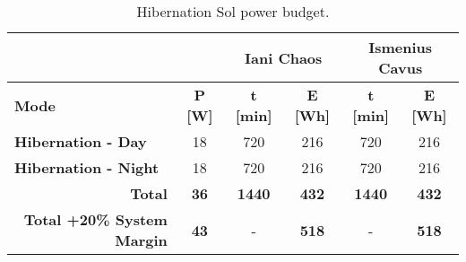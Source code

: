 \begin{table}[h]
\footnotesize
\centering
\caption[Hibernation Sol power budget]
    {Hibernation Sol power budget.}
\label{tab:hibernation-sol-power-budget}
\begin{tabular}{lc|c|c|c|c|}
\cline{3-6}
 & \textbf{} & \multicolumn{2}{c|}{\textbf{Iani Chaos}} & \multicolumn{2}{c|}{\textbf{Ismenius Cavus}} \\ \hline
\multicolumn{1}{|l|}{\textbf{Mode}} & \textbf{P {[}W{]}} & \textbf{t {[}min{]}} & \textbf{E {[}Wh{]}} & \textbf{t {[}min{]}} & \textbf{E {[}Wh{]}} \\ \hline
\multicolumn{1}{|l|}{\textbf{Hibernation - Day}} & 18 & 720 & 216 & 720 & 216 \\ \hline
\multicolumn{1}{|l|}{\textbf{Hibernation - Night}} & 18 & 720 & 216 & 720 & 216 \\ \hline
\multicolumn{1}{|r|}{\textbf{Total}} & \textbf{36} & \textbf{1440} & \textbf{432} & \textbf{1440} & \textbf{432} \\ \hline
\multicolumn{1}{|r|}{\textbf{Total +20\% System Margin}} & \textbf{43} & - & \textbf{518} & - & \textbf{518} \\ \hline
\end{tabular}
\end{table}
